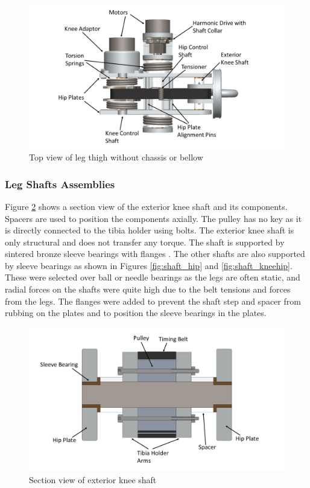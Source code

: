 \begin{figure} [H]
    \centering
    \includegraphics[width=\textwidth]{2_ProposedDesign/img/LegTopViewA.jpg}
    \caption{Top view of leg thigh without chassis or bellow}
    \label{fig:leg_topview}
\end{figure}


\subsubsection{Leg Shafts Assemblies}

Figure \ref{fig:shaft_knee} shows a section view of the exterior knee shaft and its components. Spacers are used to position the components axially. The pulley has no key as it is directly connected to the tibia holder using bolts. The exterior knee shaft is only structural and does not transfer any torque.
The shaft is supported by sintered bronze sleeve bearings with flanges \cite{qbc_bearings_flanged_2019}. The other shafts are also supported by sleeve bearings as shown in Figures \ref{fig:shaft_hip} and \ref{fig:shaft_kneehip}. These were selected over ball or needle bearings as the legs are often static, and radial forces on the shafts were quite high due to the belt tensions and forces from the legs. The flanges were added to prevent the shaft step and spacer from rubbing on the plates and to position the sleeve bearings in the plates. 

\begin{figure}[H]
    \centering
    \includegraphics[width=\textwidth]{2_ProposedDesign/img/SectionKneeShaftA.jpg}
    \caption{Section view of exterior knee shaft}
    \label{fig:shaft_knee}
\end{figure}

